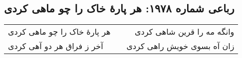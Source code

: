 \begin{center}
\section*{رباعی شماره ۱۹۷۸: هر پارهٔ خاک را چو ماهی کردی}
\label{sec:1978}
\begin{longtable}{l p{0.5cm} r}
هر پارهٔ خاک را چو ماهی کردی
&&
وانگه مه را قرین شاهی کردی
\\
آخر ز فراق هر دو آهی کردی
&&
زان آه بسوی خویش راهی کردی
\\
\end{longtable}
\end{center}

